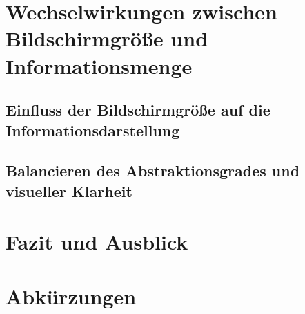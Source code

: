 \documentclass[conference,compsoc,final,a4paper]{IEEEtran}
\begin{document}


    \section{Wechselwirkungen zwischen Bildschirmgröße und Informationsmenge}

    \subsection{Einfluss der Bildschirmgröße auf die Informationsdarstellung}

    \subsection{Balancieren des Abstraktionsgrades und visueller Klarheit}




    \section{Fazit und Ausblick}


    \section*{Abkürzungen}

    \begin{acronym}[IEEE]
    \end{acronym}

    \AtNextBibliography{\small}
    \printbibliography
\end{document}
